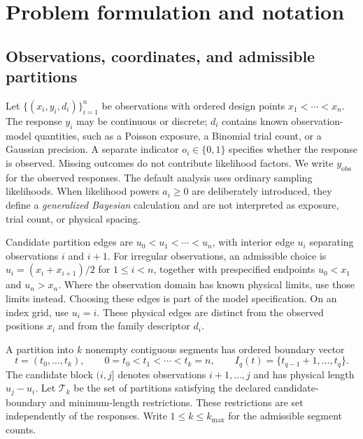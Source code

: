 \section{Problem formulation and notation}
\label{sec:setup}

\subsection{Observations, coordinates, and admissible partitions}
Let $\{(x_i,y_i,d_i)\}_{i=1}^n$ be observations with ordered design points
$x_1<\cdots<x_n$. The response $y_i$ may be continuous or discrete; $d_i$
contains known observation-model quantities, such as a Poisson exposure, a
Binomial trial count, or a Gaussian precision. A separate indicator $o_i\in
\{0,1\}$ specifies whether the response is observed. Missing outcomes do not
contribute likelihood factors. We write $y_{\mathrm{obs}}$ for the observed
responses. The default analysis uses ordinary sampling likelihoods. When
likelihood powers $a_i\geq0$ are deliberately introduced, they define a
\emph{generalized Bayesian} calculation and are not interpreted as exposure,
trial count, or physical spacing.

Candidate partition edges are $u_0<u_1<\cdots<u_n$, with interior edge $u_i$
separating observations $i$ and $i+1$. For irregular observations, an admissible
choice is $u_i=(x_i+x_{i+1})/2$ for $1\leq i<n$, together with prespecified
endpoints $u_0<x_1$ and $u_n>x_n$. Where the observation domain has known
physical limits, use those limits instead. Choosing these edges is part of the
model specification. On an index grid, use $u_i=i$. These physical edges are
distinct from the observed positions $x_i$ and from the family descriptor $d_i$.

A partition into $k$ nonempty contiguous segments has ordered boundary vector
\begin{equation}
 t=(t_0,\ldots,t_k),\qquad 0=t_0<t_1<\cdots<t_k=n,
 \qquad I_q(t)=\{t_{q-1}+1,\ldots,t_q\}.
 \label{eq:setup-partition}
\end{equation}
The candidate block $(i,j]$ denotes observations $i+1,\ldots,j$ and has
physical length $u_j-u_i$. Let $\mathcal T_k$ be the set of partitions satisfying
the declared candidate-boundary and minimum-length restrictions. These
restrictions are set independently of the responses. Write $1\leq k\leq
k_{\max}$ for the admissible segment counts.


